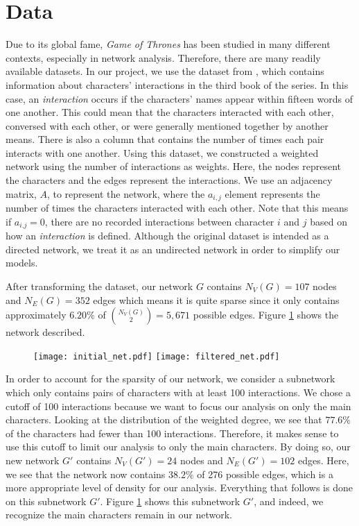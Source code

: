 \documentclass{article}
\begin{document}
\section{Data}\label{Data}
Due to its global fame, \textit{Game of Thrones} has been studied in many different contexts, especially in network analysis. Therefore, there are many readily available datasets. In our project, we use the dataset from \cite{beveridge2016network}, which contains information about characters' interactions in the third book of the series. In this case, an \textit{interaction} occurs if the characters' names appear within fifteen words of one another. This could mean that the characters interacted with each other, conversed with each other, or were generally mentioned together by another means. There is also a column that contains the number of times each pair interacts with one another. Using this dataset, we constructed a weighted network using the number of interactions as weights. Here, the nodes represent the characters and the edges represent the interactions. We use an adjacency matrix, $A$, to represent the network, where the $a_{i,j}$ element represents the number of times the characters interacted with each other. Note that this means if $a_{i.j} = 0$, there are no recorded interactions between character $i$ and $j$ based on how an \textit{interaction} is defined. Although the original dataset is intended as a directed network, we treat it as an undirected network in order to simplify our models.

After transforming the dataset, our network $G$ contains $N_V(G) = 107$ nodes and $N_E(G) = 352$ edges which means it is quite sparse since it only contains approximately $6.20\%$ of $\binom{N_V(G)}{2} = 5,671$ possible edges. Figure \ref{filtered_net} shows the network described. 
\begin{figure}[h]\label{filtered_net}
	\centering
	\vspace*{-3cm}
	\hspace*{-4cm}
	\texttt{[image: initial\_net.pdf]}
	\texttt{[image: filtered\_net.pdf]}
	\hspace*{-4cm}
	\vspace*{-2cm}
\end{figure}
In order to account for the sparsity of our network, we consider a subnetwork which only contains pairs of characters with at least 100 interactions. We chose a cutoff of 100 interactions because we want to focus our analysis on only the main characters. Looking at the distribution of the weighted degree, we see that $77.6\%$ of the characters had fewer than 100 interactions. Therefore, it makes sense to use this cutoff to limit our analysis to only the main characters. By doing so, our new network $G'$ contains $N_V(G') = 24$ nodes and $N_E(G') = 102$ edges. Here, we see that the network now contains $38.2\%$ of 276 possible edges, which is a more appropriate level of density for our analysis. Everything that follows is done on this subnetwork $G'$. Figure \ref{filtered_net} shows this subnetwork $G'$, and indeed, we recognize the main characters remain in our network.
\end{document}
